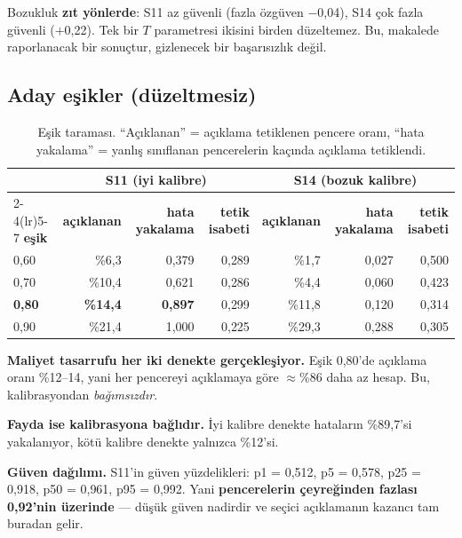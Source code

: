 \documentclass[11pt,a4paper]{report}
\begin{document}
\begin{bulgu}
Bozukluk \textbf{zıt yönlerde}: S11 az güvenli (fazla özgüven $-$0{,}04), S14
çok fazla güvenli ($+$0{,}22). Tek bir $T$ parametresi ikisini birden
düzeltemez. Bu, makalede raporlanacak bir sonuçtur, gizlenecek bir başarısızlık
değil.
\end{bulgu}

\subsection{Aday eşikler (düzeltmesiz)}

\begin{table}[H]
\centering\small
\begin{tabular}{@{}lrrrrrr@{}}
\toprule
& \multicolumn{3}{c}{\textbf{S11} (iyi kalibre)} & \multicolumn{3}{c}{\textbf{S14} (bozuk kalibre)} \\
\cmidrule(lr){2-4}\cmidrule(lr){5-7}
\textbf{eşik} & \textbf{açıklanan} & \textbf{hata yakalama} & \textbf{tetik isabeti} & \textbf{açıklanan} & \textbf{hata yakalama} & \textbf{tetik isabeti} \\
\midrule
0{,}60 & \%6{,}3  & 0{,}379 & 0{,}289 & \%1{,}7  & 0{,}027 & 0{,}500 \\
0{,}70 & \%10{,}4 & 0{,}621 & 0{,}286 & \%4{,}4  & 0{,}060 & 0{,}423 \\
\textbf{0{,}80} & \textbf{\%14{,}4} & \textbf{0{,}897} & 0{,}299 & \%11{,}8 & 0{,}120 & 0{,}314 \\
0{,}90 & \%21{,}4 & 1{,}000 & 0{,}225 & \%29{,}3 & 0{,}288 & 0{,}305 \\
\bottomrule
\end{tabular}
\caption{Eşik taraması. ``Açıklanan'' = açıklama tetiklenen pencere oranı,
``hata yakalama'' = yanlış sınıflanan pencerelerin kaçında açıklama tetiklendi.}
\end{table}

\begin{bulgu}
\textbf{Maliyet tasarrufu her iki denekte gerçekleşiyor.} Eşik 0{,}80'de
açıklama oranı \%12--14, yani her pencereyi açıklamaya göre $\approx$\%86 daha
az hesap. Bu, kalibrasyondan \emph{bağımsızdır}.

\textbf{Fayda ise kalibrasyona bağlıdır.} İyi kalibre denekte hataların
\%89{,}7'si yakalanıyor, kötü kalibre denekte yalnızca \%12'si.
\end{bulgu}

\textbf{Güven dağılımı.} S11'in güven yüzdelikleri: p1 = 0{,}512, p5 = 0{,}578,
p25 = 0{,}918, p50 = 0{,}961, p95 = 0{,}992. Yani \textbf{pencerelerin çeyreğinden
fazlası 0{,}92'nin üzerinde} --- düşük güven nadirdir ve seçici açıklamanın
kazancı tam buradan gelir.
\end{document}
